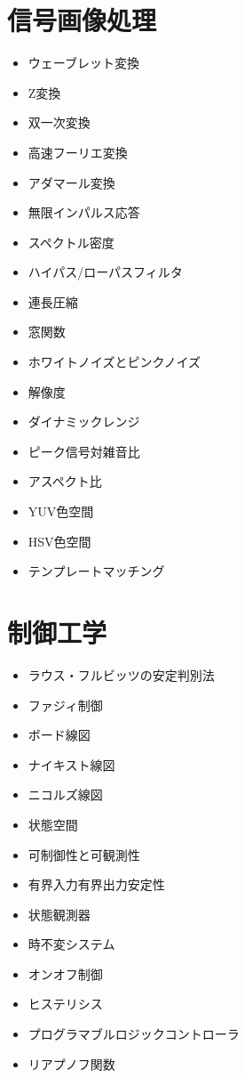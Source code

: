 \documentclass[a4j, titlepage, 11pt]{jsarticle}
\begin{document}
\section{信号画像処理}
\begin{multicols}{2}
\begin{itemize}
	\item ウェーブレット変換
	\item Z変換
	\item 双一次変換
	\item 高速フーリエ変換
	\item アダマール変換
	\item 無限インパルス応答
	\item スペクトル密度
	\item ハイパス/ローパスフィルタ
	\item 連長圧縮
	\item 窓関数
	\item ホワイトノイズとピンクノイズ
	\item 解像度
	\item ダイナミックレンジ
	\item ピーク信号対雑音比
	\item アスペクト比
	\item YUV色空間
	\item HSV色空間
	\item テンプレートマッチング
\end{itemize}
\end{multicols}

\section{制御工学}
\begin{multicols}{2}
\begin{itemize}
	\item ラウス・フルビッツの安定判別法
	\item ファジィ制御
	\item ボード線図
	\item ナイキスト線図
	\item ニコルズ線図
	\item 状態空間
	\item 可制御性と可観測性
	\item 有界入力有界出力安定性
	\item 状態観測器
	\item 時不変システム
	\item オンオフ制御
	\item ヒステリシス
	\item プログラマブルロジックコントローラ
	\item リアプノフ関数
\end{itemize}
\end{multicols}
\end{document}
